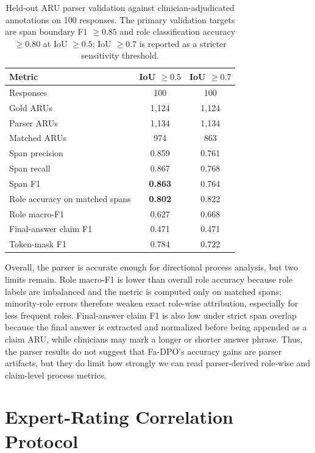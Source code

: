 \documentclass[a4paper,fleqn,doubleblind]{cas-sc}
\begin{document}
\begin{table}[htbp]
    \centering
    \footnotesize
    \caption{Held-out ARU parser validation against clinician-adjudicated annotations on 100 responses. The primary validation targets are span boundary F1 $\geq 0.85$ and role classification accuracy $\geq 0.80$ at IoU $\geq 0.5$; IoU $\geq 0.7$ is reported as a stricter sensitivity threshold.}
    \label{tab:aru_parser_validation}
    \begin{tabular}{lcc}
        \toprule
        \textbf{Metric} & \textbf{IoU $\geq 0.5$} & \textbf{IoU $\geq 0.7$} \\
        \midrule
        Responses & 100 & 100 \\
        Gold ARUs & 1,124 & 1,124 \\
        Parser ARUs & 1,134 & 1,134 \\
        Matched ARUs & 974 & 863 \\
        Span precision & 0.859 & 0.761 \\
        Span recall & 0.867 & 0.768 \\
        Span F1 & \textbf{0.863} & 0.764 \\
        Role accuracy on matched spans & \textbf{0.802} & 0.822 \\
        Role macro-F1 & 0.627 & 0.668 \\
        Final-answer claim F1 & 0.471 & 0.471 \\
        Token-mask F1 & 0.784 & 0.722 \\
        \bottomrule
    \end{tabular}
\end{table}

Overall, the parser is accurate enough for directional process analysis, but two limits remain. Role macro-F1 is lower than overall role accuracy because role labels are imbalanced and the metric is computed only on matched spans; minority-role errors therefore weaken exact role-wise attribution, especially for less frequent roles. Final-answer claim F1 is also low under strict span overlap because the final answer is extracted and normalized before being appended as a claim ARU, while clinicians may mark a longer or shorter answer phrase. Thus, the parser results do not suggest that Fa-DPO's accuracy gains are parser artifacts, but they do limit how strongly we can read parser-derived role-wise and claim-level process metrics.

\section{Expert-Rating Correlation Protocol}
\label{app:human_alignment_protocol}
\end{document}
